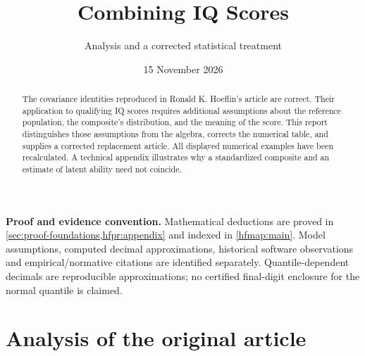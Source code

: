 
\renewcommand{\ProjectReportRunningTitle}{Combining IQ scores}
\renewcommand{\ProjectReportRunningSubtitle}{Analysis and corrected article}

\title{Combining IQ Scores}
\subtitle{Analysis and a corrected statistical treatment}
\author{\ProjectAuthor}
\date{15 November 2026}

\renewcommand{\ProjectReportHighlights}{\textbf{The covariance identities are correct}, but population calibration,
selection effects, tail assumptions and score interpretation limit their
application to high-IQ qualification. The corrected 100-test example is
approximately \(3.69\) standard deviations, rather than \(3.71\).}


\frontmatter
\ProjectReportTitlePage

\begin{abstract}
The covariance identities reproduced in Ronald K. Hoeflin's article are
correct. Their application to qualifying IQ scores requires additional
assumptions about the reference population, the composite's distribution,
and the meaning of the score. This report distinguishes those assumptions
from the algebra, corrects the numerical table, and supplies a corrected
replacement article. All displayed numerical examples have been
recalculated. A technical appendix illustrates why a standardized composite
and an estimate of latent ability need not coincide.
\end{abstract}

\noindent\textbf{Proof and evidence convention.} Mathematical deductions
are proved in \cref{sec:proof-foundations,hfpr:appendix} and indexed in
\cref{hfmap:main}. Model assumptions, computed decimal approximations,
historical software observations and empirical/normative citations are
identified separately. Quantile-dependent decimals are reproducible
approximations; no certified final-digit enclosure for the normal quantile
is claimed.

\tableofcontents
\mainmatter

\chapter{Analysis of the original article}\label{sec:analysis}

